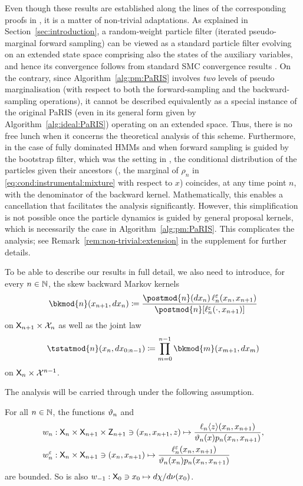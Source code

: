 Even though these results are established along the lines of the corresponding proofs in \cite{olsson:westerborn:2014b}, it is a matter of non-trivial adaptations. As explained in Section~\ref{sec:introduction}, a random-weight particle filter (iterated pseudo-marginal forward sampling) can be viewed as a standard particle filter evolving on an extended state space comprising also the states of the auxiliary variables, and hence its convergence follows from standard SMC convergence results \cite{fearnhead2008particle}. On the contrary, since Algorithm~\ref{alg:pm:PaRIS} involves \emph{two} levels of pseudo marginalisation (with respect to both the forward-sampling and the backward-sampling operations), it cannot be described equivalently as a special instance of the original PaRIS (even in its general form given by Algorithm~\ref{alg:ideal:PaRIS}) operating on an extended space. Thus, there is no free lunch when it concerns the theoretical analysis of this scheme. Furthermore, in the case of fully dominated HMMs and when forward sampling is guided by the bootstrap filter, which was the setting in \cite{olsson:westerborn:2014b}, the conditional distribution of the particles given their ancestors (\ie, the marginal of $\rho_n$ in \eqref{eq:cond:instrumental:mixture} with respect to $x$) coincides, at any time point $n$, with the denominator of the backward kernel. Mathematically, this enables a cancellation that facilitates the analysis significantly. However, this simplification is not possible once the particle dynamics is guided by general proposal kernels, which is necessarily the case in Algorithm~\ref{alg:pm:PaRIS}. This complicates the analysis; see Remark~\ref{rem:non-trivial:extension} in the supplement for further details.

To be able to describe our results in full detail, we also need to introduce, for every $n \in \mathbb{N}$, the skew backward Markov kernels 
$$
    \bkmod{n}(x_{n + 1}, \rmd x_n) \eqdef \frac{\postmod{n}(\rmd x_n) \, \udmod{n}(x_n, x_{n + 1})}{\postmod{n}[\udmod{n}(\cdot, x_{n + 1})]}
$$
on $\mathsf{X}_{n + 1} \times \mathcal{X}_n$ as well as the joint law 
\begin{equation} \label{eq:skew:backward:law}
\tstatmod{n}(x_n, \rmd x_{0:n - 1}) \eqdef \prod_{m = 0}^{n - 1} \bkmod{m}(x_{m + 1}, \rmd x_m)
\end{equation}
on $\mathsf{X}_n \times \mathcal{X}^{n - 1}$. 

The analysis will be carried through under the following assumption.
\begin{hypH}
\label{assum:bound:filter:pseudomarginal}
For all $n \in \mathbb{N}$, the functions $\vartheta_{n}$ and  
\begin{align*}
&\wgtfuncext{n} : \Xset_n \times \Xset_{n + 1} \times \Zset_{n + 1} \ni (x_n, x_{n + 1}, z) \mapsto \frac{\ukest{n}{z}(x_n, x_{n + 1})}{\adjfuncforward{n}(x) \kissforward{n}{n}(x_n, x_{n + 1})}, \\
&\wgtfuncmod{n} : \Xset_n \times \Xset_{n + 1} \ni (x_n, x_{n + 1}) \mapsto \frac{\udmod{n}(x_n, x_{n + 1})}{\adjfuncforward{n}(x_n) \kissforward{n}{n}(x_n, x_{n + 1})}
\end{align*}
are bounded. So is also $w_{-1} : \mathsf{X}_0 \ni x_0 \mapsto d \chi / d \nu(x_0)$. 
\end{hypH}

